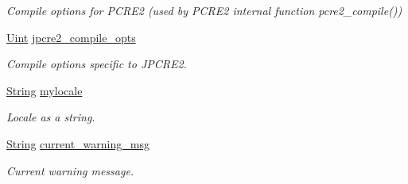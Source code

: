 \begin{DoxyCompactItemize}
\begin{DoxyCompactList}\small\item\em Compile options for P\+C\+R\+E2 (used by P\+C\+R\+E2 internal function pcre2\+\_\+compile()) \end{DoxyCompactList}\item 
\hypertarget{classjpcre2_1_1Regex_abdd26c3bc1c3132f0aa73dde1690a7ef}{}\label{classjpcre2_1_1Regex_abdd26c3bc1c3132f0aa73dde1690a7ef} 
\hyperlink{namespacejpcre2_a078242d38221a13fb3543b9edd78c099}{Uint} \hyperlink{classjpcre2_1_1Regex_abdd26c3bc1c3132f0aa73dde1690a7ef}{jpcre2\+\_\+compile\+\_\+opts}
\begin{DoxyCompactList}\small\item\em Compile options specific to J\+P\+C\+R\+E2. \end{DoxyCompactList}\item 
\hypertarget{classjpcre2_1_1Regex_a92a3ad992cade62d103248302f7e2f2d}{}\label{classjpcre2_1_1Regex_a92a3ad992cade62d103248302f7e2f2d} 
\hyperlink{namespacejpcre2_a91f03070152fb228bc116c5a737f1d16}{String} \hyperlink{classjpcre2_1_1Regex_a92a3ad992cade62d103248302f7e2f2d}{mylocale}
\begin{DoxyCompactList}\small\item\em Locale as a string. \end{DoxyCompactList}\item 
\hypertarget{classjpcre2_1_1Regex_a1cfacd49c8bceaae1e2a66efd4082ea8}{}\label{classjpcre2_1_1Regex_a1cfacd49c8bceaae1e2a66efd4082ea8} 
\hyperlink{namespacejpcre2_a91f03070152fb228bc116c5a737f1d16}{String} \hyperlink{classjpcre2_1_1Regex_a1cfacd49c8bceaae1e2a66efd4082ea8}{current\+\_\+warning\+\_\+msg}
\begin{DoxyCompactList}\small\item\em Current warning message. \end{DoxyCompactList}\end{DoxyCompactItemize}

